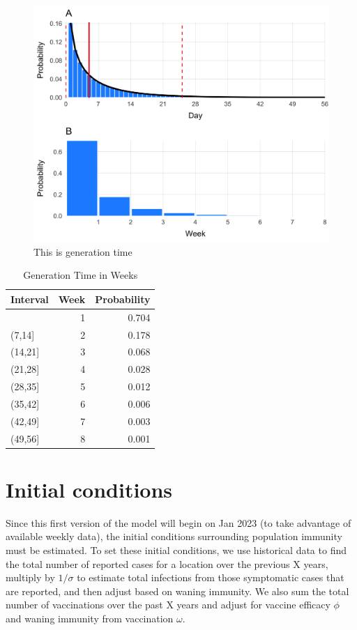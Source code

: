 \documentclass[
]{book}
\begin{document}
\begin{figure}

{\centering \includegraphics[width=0.95\linewidth]{figures/generation_time} 

}

\caption{This is generation time}\label{fig:generation}
\end{figure}

\begin{table}
\centering
\caption{\label{tab:unnamed-chunk-3}Generation Time in Weeks}
\centering
\begin{tabular}[t]{l|r|r}
\hline
Interval & Week & Probability\\
\hline
[0,7] & 1 & 0.704\\
\hline
(7,14] & 2 & 0.178\\
\hline
(14,21] & 3 & 0.068\\
\hline
(21,28] & 4 & 0.028\\
\hline
(28,35] & 5 & 0.012\\
\hline
(35,42] & 6 & 0.006\\
\hline
(42,49] & 7 & 0.003\\
\hline
(49,56] & 8 & 0.001\\
\hline
\end{tabular}
\end{table}

\section{Initial conditions}\label{initial-conditions}

Since this first version of the model will begin on Jan 2023 (to take advantage of available weekly data), the initial conditions surrounding population immunity must be estimated. To set these initial conditions, we use historical data to find the total number of reported cases for a location over the previous X years, multiply by \(1/\sigma\) to estimate total infections from those symptomatic cases that are reported, and then adjust based on waning immunity. We also sum the total number of vaccinations over the past X years and adjust for vaccine efficacy \(\phi\) and waning immunity from vaccination \(\omega\).
\end{document}
